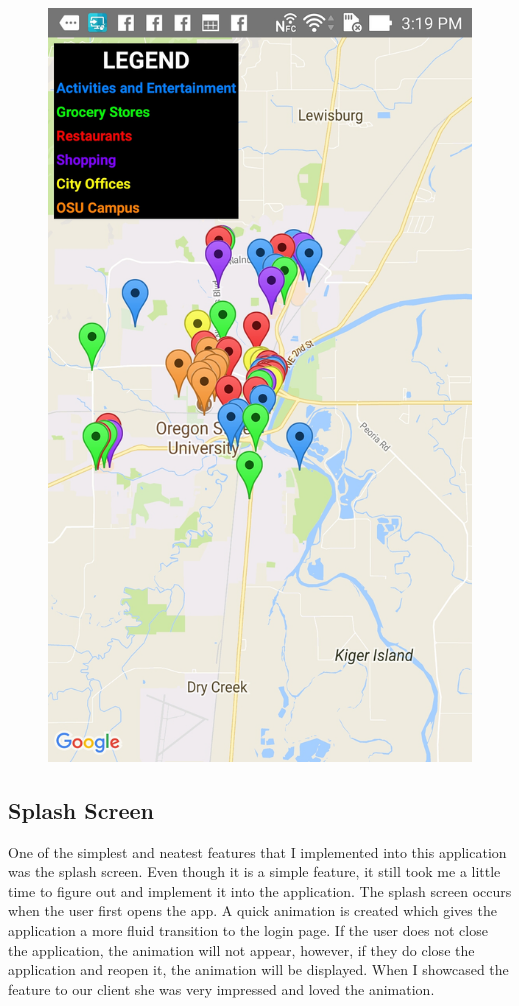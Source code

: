 \documentclass[draftclsnofoot, onecolumn, 10pt, compsoc]{IEEEtran}
\begin{document}
         \begin{figure}
            \includegraphics[scale=1, bb=0 0 30 30]{resourcemap}
         \end{figure}

      \subsection{Splash Screen}
         One of the simplest and neatest features that I implemented into this application was the splash screen. Even though it is a simple feature, it still took me a little time to figure out and implement it into the application. The splash screen occurs when the user first opens the app. A quick animation is created which gives the application a more fluid transition to the login page. If the user does not close the application, the animation will not appear, however, if they do close the application and reopen it, the animation will be displayed. When I showcased the feature to our client she was very impressed and loved the animation.
\end{document}
